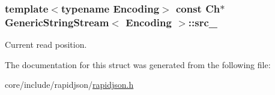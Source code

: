 \subsubsection[{\texorpdfstring{src\+\_\+}{src_}}]{\setlength{\rightskip}{0pt plus 5cm}template$<$typename Encoding$>$ const {\bf Ch}$\ast$ {\bf Generic\+String\+Stream}$<$ Encoding $>$\+::src\+\_\+}\hypertarget{structGenericStringStream_aeda813798e3f2d6bfdac86afc11b6b80}{}\label{structGenericStringStream_aeda813798e3f2d6bfdac86afc11b6b80}


Current read position. 



The documentation for this struct was generated from the following file\+:\begin{DoxyCompactItemize}
\item 
core/include/rapidjson/\hyperlink{rapidjson_8h}{rapidjson.\+h}\end{DoxyCompactItemize}
